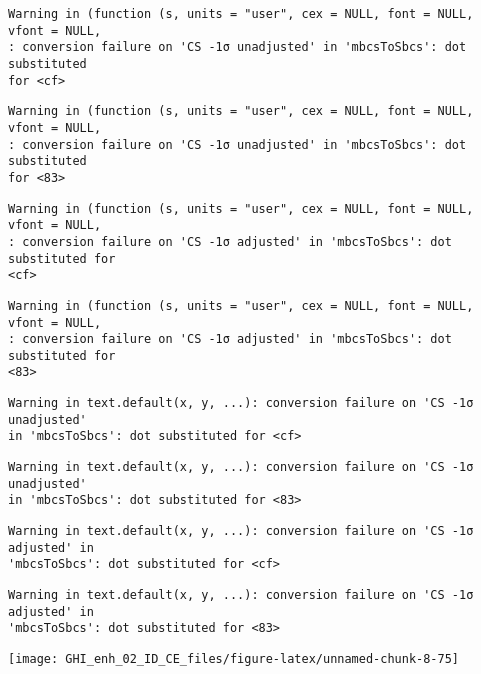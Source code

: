 \documentclass[
  10pt,
  a4paper,oneside]{article}
\begin{document}
\begin{verbatim}
Warning in (function (s, units = "user", cex = NULL, font = NULL, vfont = NULL,
: conversion failure on 'CS -1σ unadjusted' in 'mbcsToSbcs': dot substituted
for <cf>
\end{verbatim}

\begin{verbatim}
Warning in (function (s, units = "user", cex = NULL, font = NULL, vfont = NULL,
: conversion failure on 'CS -1σ unadjusted' in 'mbcsToSbcs': dot substituted
for <83>
\end{verbatim}

\begin{verbatim}
Warning in (function (s, units = "user", cex = NULL, font = NULL, vfont = NULL,
: conversion failure on 'CS -1σ adjusted' in 'mbcsToSbcs': dot substituted for
<cf>
\end{verbatim}

\begin{verbatim}
Warning in (function (s, units = "user", cex = NULL, font = NULL, vfont = NULL,
: conversion failure on 'CS -1σ adjusted' in 'mbcsToSbcs': dot substituted for
<83>
\end{verbatim}

\begin{verbatim}
Warning in text.default(x, y, ...): conversion failure on 'CS -1σ unadjusted'
in 'mbcsToSbcs': dot substituted for <cf>
\end{verbatim}

\begin{verbatim}
Warning in text.default(x, y, ...): conversion failure on 'CS -1σ unadjusted'
in 'mbcsToSbcs': dot substituted for <83>
\end{verbatim}

\begin{verbatim}
Warning in text.default(x, y, ...): conversion failure on 'CS -1σ adjusted' in
'mbcsToSbcs': dot substituted for <cf>
\end{verbatim}

\begin{verbatim}
Warning in text.default(x, y, ...): conversion failure on 'CS -1σ adjusted' in
'mbcsToSbcs': dot substituted for <83>
\end{verbatim}

\begin{center}\texttt{[image: GHI\_enh\_02\_ID\_CE\_files/figure-latex/unnamed-chunk-8-75]} \end{center}
\end{document}
